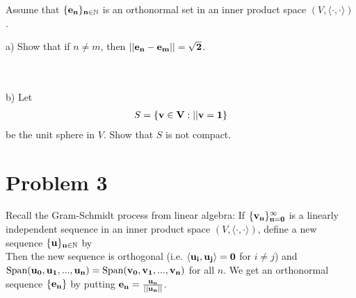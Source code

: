 \documentclass[12pt,letterpaper]{article}
\begin{document}
Assume that $\{ \bf{e}_n \}_{n\in\mathbb{N}}$ is an orthonormal set in an inner product space $(V, \langle\cdot,\cdot\rangle)$.

a) Show that if $n\neq m$, then $||\bf{e}_n-\bf{e}_m|| = \sqrt{2}$.


\noindent{}
\\
\\
b) Let
\begin{align*}
	S = \{\bf{v} \in V : ||\bf{v} = 1 \}
\end{align*}
be the unit sphere in $V$. Show that $S$ is not compact.


\noindent{}

\newpage
\section*{Problem 3}
Recall the Gram-Schmidt process from linear algebra: If $\{ \bf{v}_n\}_{n=0}^\infty$ is a linearly independent sequence in an inner product space $(V, \langle\cdot,\cdot\rangle)$, define a new sequence $\{\bf{u}\}_{n\in\mathbb{N}}$ by
\\

\noindent
Then the new sequence is orthogonal (i.e. $\langle \bf{u}_i, \bf{u}_j \rangle = 0$ for $i \neq j$) and $\text{Span}(\bf{u}_0,\bf{u}_1,...,\bf{u}_n) = \text{Span}(\bf{v}_0,\bf{v}_1,...,\bf{v}_n) $ for all $n$. We get an orthonormal sequence $\{\bf{e}_n\}$ by putting $\bf{e}_n = \frac{\bf{u}_n}{||\bf{u}_n||}$.
\end{document}
